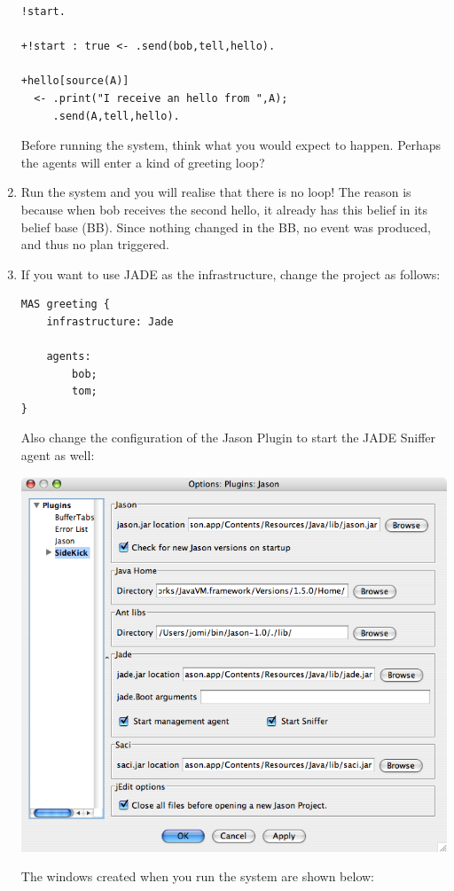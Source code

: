 \documentclass[a4paper]{article}
\begin{document}
\begin{enumerate}
\begin{verbatim}
!start.

+!start : true <- .send(bob,tell,hello).

+hello[source(A)] 
  <- .print("I receive an hello from ",A);
     .send(A,tell,hello).
\end{verbatim}

  Before running the system, think what you would expect to happen.
  Perhaps the agents will enter a kind of greeting loop?

\item Run the system and you will realise that there is no loop!  The
  reason is because when bob receives the second hello, it already has
  this belief in its belief base (BB). Since nothing changed in the
  BB, no event was produced, and thus no plan triggered.

\item If you want to use JADE as the infrastructure, change the
  project as follows:
\begin{verbatim}
MAS greeting {
    infrastructure: Jade

    agents:
        bob;
        tom;
}
\end{verbatim}
  Also change the configuration of the Jason Plugin to start the JADE
  Sniffer agent as well:

  \includegraphics{figures/screen-confjade.png}

  The windows created when you run the system are shown below:


\end{enumerate}
\end{document}
